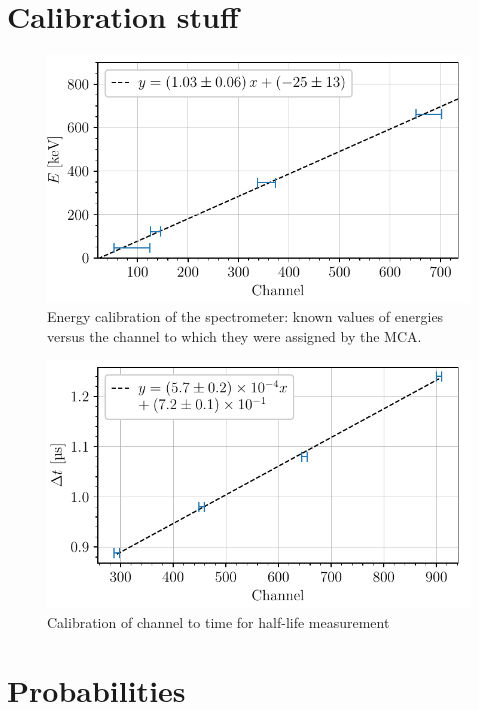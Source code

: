 \section{Calibration stuff}
\label{sec:calibration}
\begin{figure}[htbp]
    \centering
    \includegraphics[scale=1]{figures/calibration_energy.pdf}
    \caption{Energy calibration of the spectrometer: known values of energies 
    versus the channel to which they were assigned by the MCA.}
    \label{fig:calibration_energy}
\end{figure}

\begin{figure}[htbp]
    \centering
    \includegraphics[scale=1]{figures/calibration_time_interval.pdf}    
    \caption{Calibration of channel to time for half-life measurement}
    \label{fig:calibration_halflife}
\end{figure}

\section{Probabilities}
\label{sec:pearson}

